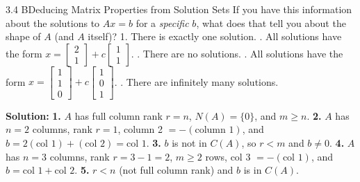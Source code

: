 \documentclass[11pt,a4paper,openany,oneside]{book}
\def\vect#1{#1}%
\def\mathbf#1{#1}%
\newcommand{\vect}[1]{\mathbf{#1}}
\numberwithin{equation}{chapter}
\begin{document}
\begin{example}{3.4 B}{Deducing Matrix Properties from Solution Sets}
If you have this information about the solutions to $A\vect{x} = \vect{b}$ for a \emph{specific} $\vect{b}$, what does that tell you about the shape of $A$ (and $A$ itself)?
1. There is exactly one solution. . All solutions have the form $\vect{x} = \begin{bmatrix}2\\1\end{bmatrix} + c\begin{bmatrix}1\\1\end{bmatrix}$. . There are no solutions. . All solutions have the form $\vect{x} = \begin{bmatrix}1\\1\\0\end{bmatrix} + c\begin{bmatrix}1\\0\\1\end{bmatrix}$. . There are infinitely many solutions.
\end{example}
\textbf{Solution:}
\textbf{1.} $A$ has full column rank $r = n$, $N(A) = \{\vect{0}\}$, and $m \ge n$.
\textbf{2.} $A$ has $n=2$ columns, rank $r=1$, column 2 $= -(\text{column 1})$, and $\vect{b} = 2(\text{col 1}) + (\text{col 2}) = \text{col 1}$.
\textbf{3.} $\vect{b}$ is not in $C(A)$, so $r < m$ and $\vect{b} \neq \vect{0}$.
\textbf{4.} $A$ has $n=3$ columns, rank $r = 3 - 1 = 2$, $m \ge 2$ rows, col 3 $= -(\text{col 1})$, and $\vect{b} = \text{col 1} + \text{col 2}$.
\textbf{5.} $r < n$ (not full column rank) and $\vect{b}$ is in $C(A)$.
\end{document}
